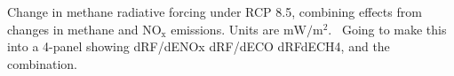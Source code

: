 Change in methane radiative forcing under RCP 8.5, combining effects from changes in methane and $\mathrm{NO_x}$ emissions. Units are $\mathrm{mW/m^2}$.~\label{fig:drfcomb85} Going to make this into a 4-panel showing dRF/dENOx dRF/dECO dRFdECH4, and the combination.
